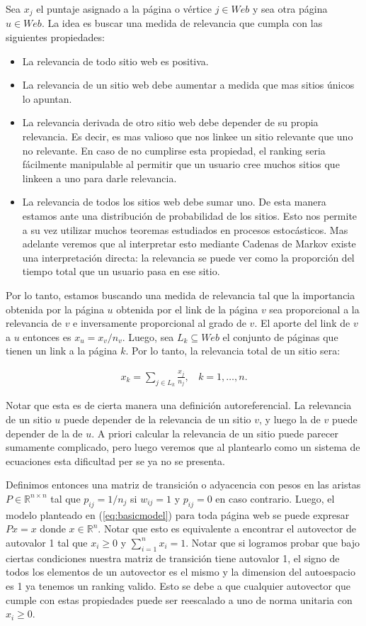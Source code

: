 Sea $x_j$ el puntaje asignado a la página o vértice $j \in Web$ y sea otra página $u \in Web$. La idea es buscar una medida de relevancia que cumpla con las siguientes propiedades:
\begin{itemize}
  \item La relevancia de todo sitio web es positiva.
  \item La relevancia de un sitio web debe aumentar a medida que mas sitios únicos lo apuntan.
  \item La relevancia derivada de otro sitio web debe depender de su propia relevancia. Es decir, es mas valioso que nos linkee un sitio relevante que uno no relevante. En caso de no cumplirse esta propiedad, el ranking seria fácilmente manipulable al permitir que un usuario cree muchos sitios que linkeen a uno para darle relevancia.
  \item La relevancia de todos los sitios web debe sumar uno. De esta manera estamos ante una distribución de probabilidad de los sitios. Esto nos permite a su vez utilizar muchos teoremas estudiados en procesos estocásticos. Mas adelante veremos que al interpretar esto mediante Cadenas de Markov existe una interpretación directa: la relevancia se puede ver como la proporción del tiempo total que un usuario pasa en ese sitio.
\end{itemize} 

Por lo tanto, estamos buscando una medida de relevancia tal que la importancia obtenida por la página $u$ obtenida por el link de la página $v$ sea proporcional a la relevancia de $v$ e inversamente proporcional al grado de $v$. El aporte del link de $v$ a $u$ entonces es $x_u = x_v / n_v$. Luego, sea $L_k \subseteq Web$ el conjunto de páginas que tienen un link a la página $k$. Por lo tanto, la relevancia total de un sitio sera:

\begin{eqnarray}
x_k = \sum_{j \in L_k} \frac{x_j}{n_j},~~~~k = 1,\dots,n. \label{eq:basicmodel}
\end{eqnarray}

Notar que esta es de cierta manera una definición autoreferencial. La relevancia de un sitio $u$ puede depender de la relevancia de un sitio $v$, y luego la de $v$ puede depender de la de $u$. A priori calcular la relevancia de un sitio puede parecer sumamente complicado, pero luego veremos que al plantearlo como un sistema de ecuaciones esta dificultad per se ya no se presenta.

Definimos entonces una matriz de transición o adyacencia con pesos en las aristas $P \in \mathbb{R}^{n \times n}$ tal que $p_{ij} = 1 / n_j$ si $w_{ij} = 1$ y $p_{ij} = 0$ en caso contrario. Luego, el modelo planteado en (\ref{eq:basicmodel}) para toda página web se puede expresar $Px = x$ donde $x \in \mathbb{R}^n$. Notar que esto es equivalente a encontrar el autovector de autovalor 1 tal que $x_i \geq 0$ y $\sum_{i=1}^{n} x_i = 1$. Notar que si logramos probar que bajo ciertas condiciones nuestra matriz de transición tiene autovalor 1, el signo de todos los elementos de un autovector es el mismo y la dimension del autoespacio es 1 ya tenemos un ranking valido. Esto se debe a que cualquier autovector que cumple con estas propiedades puede ser reescalado a uno de norma unitaria con $x_i \geq 0$.

